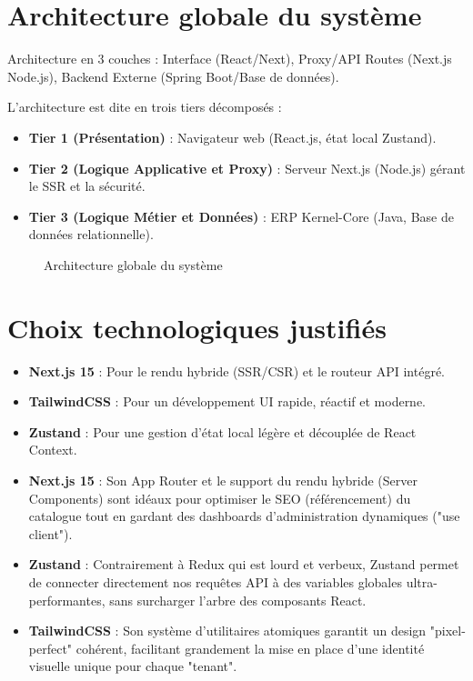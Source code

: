 \documentclass[12pt, a4paper]{report}
\begin{document}
\section{Architecture globale du système}
Architecture en 3 couches : Interface (React/Next), Proxy/API Routes (Next.js Node.js), Backend Externe (Spring Boot/Base de données).

L'architecture est dite en trois tiers décomposés :
\begin{itemize}
    \item \textbf{Tier 1 (Présentation)} : Navigateur web (React.js, état local Zustand).
    \item \textbf{Tier 2 (Logique Applicative et Proxy)} : Serveur Next.js (Node.js) gérant le SSR et la sécurité.
    \item \textbf{Tier 3 (Logique Métier et Données)} : ERP Kernel-Core (Java, Base de données relationnelle).
\end{itemize}

\begin{figure}[h!]
    \centering
    \vspace{6cm} %
    \caption{Architecture globale du système}
    \label{fig:architecture}
\end{figure}

\section{Choix technologiques justifiés}
\begin{itemize}
    \item \textbf{Next.js 15} : Pour le rendu hybride (SSR/CSR) et le routeur API intégré.
    \item \textbf{TailwindCSS} : Pour un développement UI rapide, réactif et moderne.
    \item \textbf{Zustand} : Pour une gestion d'état local légère et découplée de React Context.
    \item \textbf{Next.js 15} : Son App Router et le support du rendu hybride (Server Components) sont idéaux pour optimiser le SEO (référencement) du catalogue tout en gardant des dashboards d'administration dynamiques ("use client").
    \item \textbf{Zustand} : Contrairement à Redux qui est lourd et verbeux, Zustand permet de connecter directement nos requêtes API à des variables globales ultra-performantes, sans surcharger l'arbre des composants React.
    \item \textbf{TailwindCSS} : Son système d'utilitaires atomiques garantit un design "pixel-perfect" cohérent, facilitant grandement la mise en place d'une identité visuelle unique pour chaque "tenant".
\end{itemize}
\end{document}
